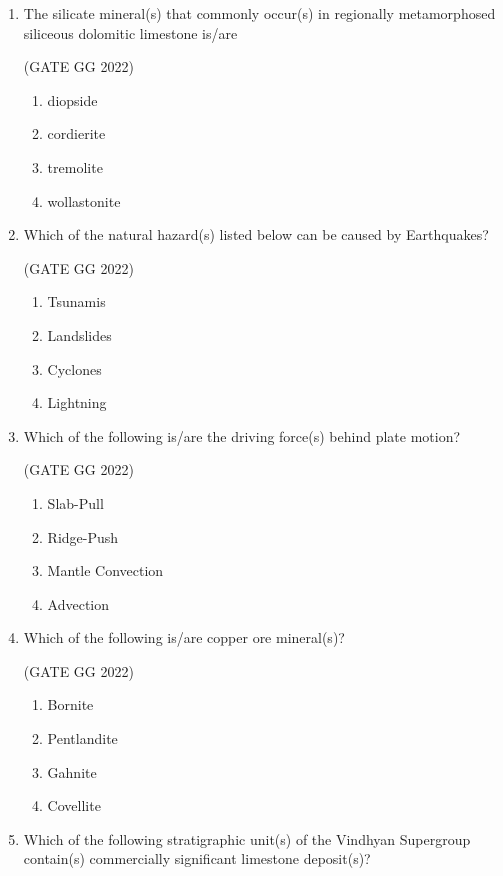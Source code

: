 \documentclass[journal]{IEEEtran}
\begin{document}
\begin{enumerate}[start=1]
\item The silicate mineral(s) that commonly occur(s) in regionally metamorphosed 
siliceous dolomitic limestone is/are  

\hfill(GATE GG 2022)
\begin{enumerate}
\item diopside
\item cordierite
\item tremolite
\item wollastonite
\end{enumerate}
\vspace{0.5cm}

\item Which of the natural hazard(s) listed below can be caused by Earthquakes? 

\hfill(GATE GG 2022)
\begin{enumerate}
\item Tsunamis
\item Landslides
\item Cyclones
\item Lightning
\end{enumerate}
\vspace{0.5cm}

\item Which of the following is/are the driving force(s) behind plate motion? 

\hfill(GATE GG 2022)
\begin{enumerate}
\item Slab-Pull
\item Ridge-Push
\item Mantle Convection
\item Advection
\end{enumerate}
\vspace{0.5cm}

\item Which of the following is/are copper ore mineral(s)?  

\hfill(GATE GG 2022)
\begin{enumerate}
\item Bornite
\item Pentlandite
\item Gahnite
\item Covellite
\end{enumerate}
\vspace{0.5cm}

\item Which of the following stratigraphic unit(s) of the Vindhyan Supergroup contain(s) commercially significant limestone deposit(s)?  


\end{enumerate}
\end{document}
